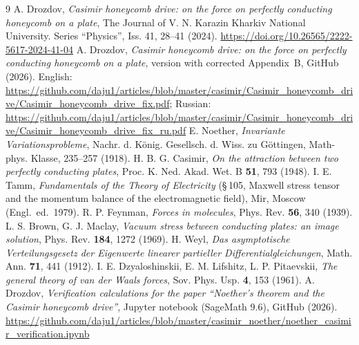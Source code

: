 \documentclass[twoside, 10pt]{article}
\begin{document}
\begin{thebibliography}{9}
A. Drozdov, \textit{Casimir honeycomb drive: on the force on perfectly conducting honeycomb on a plate}, The Journal of V. N. Karazin Kharkiv National University. Series “Physics”, Iss. 41, 28--41 (2024). \url{https://doi.org/10.26565/2222-5617-2024-41-04}
A. Drozdov, \textit{Casimir honeycomb drive: on the force on perfectly conducting honeycomb on a plate}, version with corrected Appendix~B, GitHub (2026). English: \url{https://github.com/daju1/articles/blob/master/casimir/Casimir_honeycomb_drive/Casimir_honeycomb_drive_fix.pdf}; Russian: \url{https://github.com/daju1/articles/blob/master/casimir/Casimir_honeycomb_drive/Casimir_honeycomb_drive_fix_ru.pdf}
E. Noether, \textit{Invariante Variationsprobleme}, Nachr. d. König. Gesellsch. d. Wiss. zu Göttingen, Math-phys. Klasse, 235–257 (1918).
H. B. G. Casimir, \textit{On the attraction between two perfectly conducting plates}, Proc. K. Ned. Akad. Wet. B \textbf{51}, 793 (1948).
I. E. Tamm, \textit{Fundamentals of the Theory of Electricity} (\S\,105, Maxwell stress tensor and the momentum balance of the electromagnetic field), Mir, Moscow (Engl.\ ed.\ 1979).
R. P. Feynman, \textit{Forces in molecules}, Phys. Rev. \textbf{56}, 340 (1939).
L. S. Brown, G. J. Maclay, \textit{Vacuum stress between conducting plates: an image solution}, Phys. Rev. \textbf{184}, 1272 (1969).
H. Weyl, \textit{Das asymptotische Verteilungsgesetz der Eigenwerte linearer partieller Differentialgleichungen}, Math. Ann. \textbf{71}, 441 (1912).
I. E. Dzyaloshinskii, E. M. Lifshitz, L. P. Pitaevskii, \textit{The general theory of van der Waals forces}, Sov. Phys. Usp. \textbf{4}, 153 (1961).
A. Drozdov, \textit{Verification calculations for the paper ``Noether's theorem and the Casimir honeycomb drive''}, Jupyter notebook (SageMath 9.6), GitHub (2026). \url{https://github.com/daju1/articles/blob/master/casimir_noether/noether_casimir_verification.ipynb}
\end{thebibliography}
\end{document}
